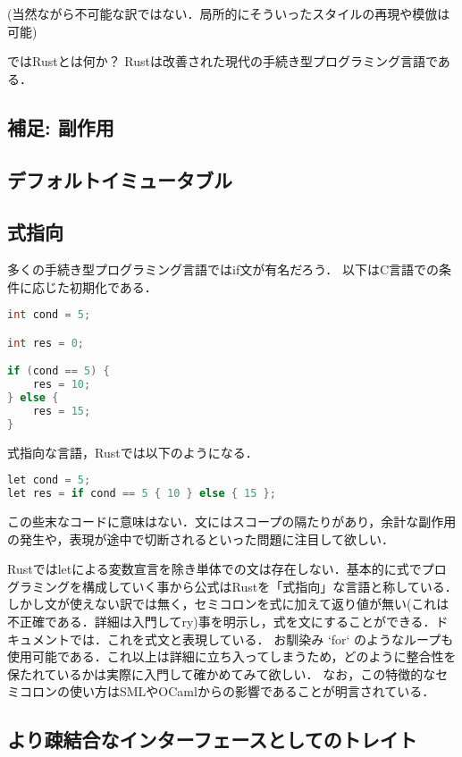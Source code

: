 (当然ながら不可能な訳ではない．局所的にそういったスタイルの再現や模倣は可能)

ではRustとは何か？
Rustは改善された現代の手続き型プログラミング言語である．

\subsection{補足: 副作用}

\subsection{デフォルトイミュータブル}

\subsection{式指向}
多くの手続き型プログラミング言語ではif文が有名だろう．
以下はC言語での条件に応じた初期化である．

\begin{lstlisting}[language={C},caption=Cにおけるif文,label=c_if]
int cond = 5;

int res = 0;

if (cond == 5) {
    res = 10;
} else {
    res = 15;
}
\end{lstlisting}
式指向な言語，Rustでは以下のようになる．
\begin{lstlisting}[language={C++},caption=Rustにおけるif式,label=rust_if]
let cond = 5;
let res = if cond == 5 { 10 } else { 15 };
\end{lstlisting}
この些末なコードに意味はない．文にはスコープの隔たりがあり，余計な副作用の発生や，表現が途中で切断されるといった問題に注目して欲しい．

Rustではletによる変数宣言を除き単体での文は存在しない．基本的に式でプログラミングを構成していく事から公式はRustを「式指向」な言語と称している．
しかし文が使えない訳では無く，セミコロンを式に加えて返り値が無い(これは不正確である．詳細は入門してry)事を明示し，式を文にすることができる．ドキュメントでは．これを式文と表現している．
お馴染み `for` のようなループも使用可能である．これ以上は詳細に立ち入ってしまうため，どのように整合性を保たれているかは実際に入門して確かめてみて欲しい．
なお，この特徴的なセミコロンの使い方はSMLやOCamlからの影響であることが明言されている．

\subsection{より疎結合なインターフェースとしてのトレイト}


